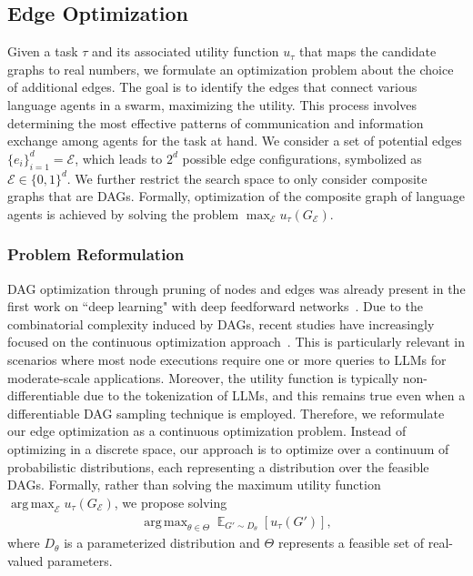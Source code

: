 \documentclass{article}
\DeclareMathOperator*{\argmax}{arg\,max}
\DeclareMathOperator{\E}{\mathbb{E}}
\theoremstyle{plain}
\theoremstyle{definition}
\theoremstyle{remark}
\begin{document}
\subsection{Edge Optimization}
Given a task $\tau$ and its associated utility function $u_\tau$ that maps the candidate graphs to real numbers,
we formulate an optimization problem about the choice of additional edges. 
The goal is to identify the edges that connect various language agents in a swarm, maximizing the utility. This process involves determining the most effective patterns of communication and information exchange among agents for the task at hand.
We consider a set of potential edges $\{e_i\}_{i=1}^d = \mathcal{E}$, which leads to $2^d$ possible edge configurations, symbolized as $\mathcal{E} \in \{0,1\}^d$. We further restrict the search space to only consider composite graphs that are DAGs.
Formally, optimization of the composite graph of language agents is achieved by solving the problem $\max_{\mathcal{E}} u_{\tau}(G_{\mathcal{E}})$.

\subsubsection{Problem Reformulation}
DAG optimization through pruning of nodes and edges was already present in the first work on ``deep learning" with deep feedforward networks~\citep{ivakhnenko1965cybernetic, ivakhnenko1968group}.
Due to the combinatorial complexity induced by DAGs, recent studies have increasingly focused on the continuous optimization approach~\citep{vowels2022d}. 
This is particularly relevant in scenarios where most node executions require one or more queries to LLMs for moderate-scale applications. 
Moreover, the utility function is typically non-differentiable due to the tokenization of LLMs, and this remains true even when a differentiable DAG sampling technique is employed.
Therefore, we reformulate our edge optimization as a continuous optimization problem.
Instead of optimizing in a discrete space, our approach is to optimize over a continuum of probabilistic distributions, each representing a distribution over the feasible DAGs.
Formally, rather than solving the maximum utility function $\argmax_{\mathcal{E}} u_\tau(G_{\mathcal{E}})$, we propose solving
\begin{align}
    \argmax_{\theta \in \Theta} \E_{G' \sim D_\theta}[u_\tau(G')],
    \label{eq:objective}
\end{align}
where $D_\theta$ is a parameterized distribution and $\Theta$ represents a feasible set of real-valued parameters.
\end{document}
